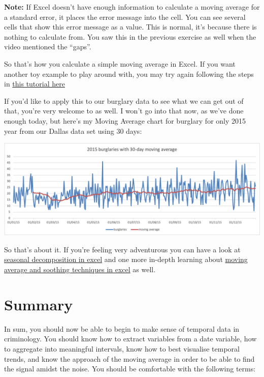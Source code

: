 \documentclass[
]{book}
\begin{document}
\textbf{Note:} If Excel doesn't have enough information to calculate a moving average for a standard error, it places the error message into the cell. You can see several cells that show this error message as a value. This is normal, it's because there is nothing to calculate from. You saw this in the previous exercise as well when the video mentioned the ``gaps''.

So that's how you calculate a simple moving average in Excel. If you want another toy example to play around with, you may try again following the steps in \href{http://www.excel-easy.com/examples/moving-average.html}{this tutorial here}

If you'd like to apply this to our burglary data to see what we can get out of that, you're very welcome to as well. I won't go into that now, as we've done enough today, but here's my Moving Average chart for burglary for only 2015 year from our Dallas data set using 30 days:

\includegraphics{imgs/burg_2015_MA.png}

So that's about it. If you're feeling very adventurous you can have a look at \href{https://www.searchlaboratory.com/2013/09/time-series-decomposition-using-excel/}{seasonal decomposition in excel} and one more in-depth learning about \href{http://www.informit.com/articles/article.aspx?p=2433607}{moving average and soothing techniques in excel} as well.

\hypertarget{summary-6}{%
\section{Summary}\label{summary-6}}

In sum, you should now be able to begin to make sense of temporal data in criminology. You should know how to extract variables from a date variable, how to aggregate into meaningful intervals, know how to best visualise temporal trends, and know the approach of the moving average in order to be able to find the signal amidst the noise. You should be comfortable with the following terms:
\end{document}
